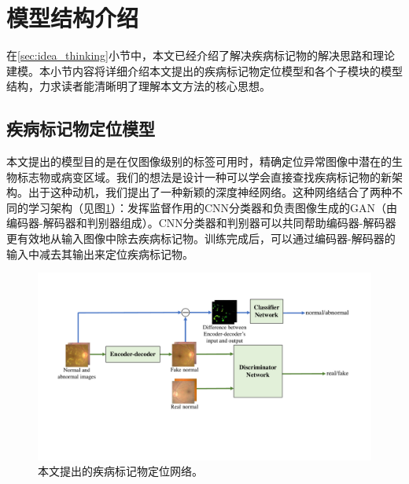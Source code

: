 \section{模型结构介绍}\label{sec:model_architecture_intro}
在\ref{sec:idea_thinking}小节中，本文已经介绍了解决疾病标记物的解决思路和理论建模。本小节内容将详细介绍本文提出的疾病标记物定位模型和各个子模块的模型结构，力求读者能清晰明了理解本文方法的核心思想。


\subsection{疾病标记物定位模型}\label{subsec:model_architecture}
本文提出的模型目的是在仅图像级别的标签可用时，精确定位异常图像中潜在的生物标志物或病变区域。我们的想法是设计一种可以学会直接查找疾病标记物的新架构。出于这种动机，我们提出了一种新颖的深度神经网络。这种网络结合了两种不同的学习架构（见图\ref{fig:our_model_architecture}）：发挥监督作用的CNN分类器和负责图像生成的GAN（由编码器-解码器和判别器组成）。CNN分类器和判别器可以共同帮助编码器-解码器更有效地从输入图像中除去疾病标记物。训练完成后，可以通过编码器-解码器的输入中减去其输出来定位疾病标记物。
\begin{figure}[h]
	\centering
	\includegraphics[width=1.0\textwidth]{figure/method.pdf}
	\caption[本文提出的疾病标记物定位网络]{本文提出的疾病标记物定位网络。} 
	\label{fig:our_model_architecture}
\end{figure}
